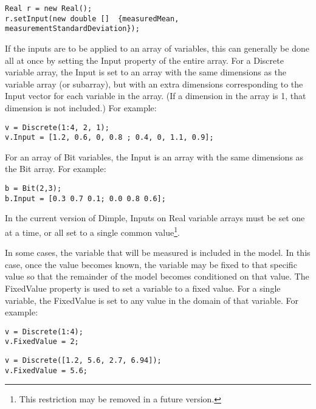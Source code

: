 \fi

\ifjava

\begin{lstlisting}
Real r = new Real();
r.setInput(new double []  {measuredMean, measurementStandardDeviation});
\end{lstlisting}
\fi

\ifmatlab

If the inputs are to be applied to an array of variables, this can generally be done all at once by setting the Input property of the entire array.  For a Discrete variable array, the Input is set to an array with the same dimensions as the variable array (or subarray), but with an extra dimensions corresponding to the Input vector for each variable in the array.  (If a dimension in the array is 1, that dimension is not included.) For example:

\begin{lstlisting}
v = Discrete(1:4, 2, 1);
v.Input = [1.2, 0.6, 0, 0.8 ; 0.4, 0, 1.1, 0.9];
\end{lstlisting}

For an array of Bit variables, the Input is an array with the same dimensions as the Bit array.  For example:

\begin{lstlisting}
b = Bit(2,3);
b.Input = [0.3 0.7 0.1; 0.0 0.8 0.6];
\end{lstlisting}

In the current version of Dimple, Inputs on Real variable arrays must be set one at a time, or all set to a single common value\footnote{This restriction may be removed in a future version.}.

\fi

\label{sec:FixingAVariableValue}

In some cases, the variable that will be measured is included in the model.  In this case, once the value becomes known, the variable may be fixed to that specific value so that the remainder of the model becomes conditioned on that value.  The FixedValue property is used to set a variable to a fixed value.  For a single variable, the FixedValue is set to any value in the domain of that variable.  For example:

\begin{lstlisting}
v = Discrete(1:4);
v.FixedValue = 2;
\end{lstlisting}

\begin{lstlisting}
v = Discrete([1.2, 5.6, 2.7, 6.94]);
v.FixedValue = 5.6;
\end{lstlisting}


